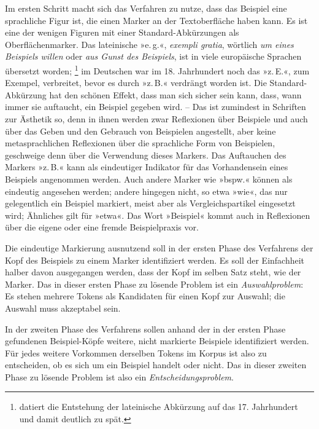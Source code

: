\documentclass{article}
\newcommand*{\latein}{\textit}%
\renewcommand*{\see}{\autocap{v}gl\adddot}%
\begin{document}
Im ersten Schritt macht sich das Verfahren zu nutze, dass das Beispiel
eine sprachliche Figur ist, die einen Marker an der Textoberfläche
haben kann. Es ist eine der wenigen Figuren mit einer
Standard-Abkürzungen als Oberflächenmarker. Das lateinische »e.\,g.«,
\latein{exempli gratia}, wörtlich \emph{um eines Beispiels willen}
oder \emph{aus Gunst des Beispiels}, ist in viele europäische Sprachen
übersetzt worden;%
\footnote{\Textcite[118]{Cappelli1990a} datiert die Entstehung der
  lateinische Abkürzung auf das 17. Jahrhundert und damit deutlich zu
  spät.} %
im Deutschen war im 18. Jahrhundert noch das »z.\,E.«, zum Exempel,
verbreitet, bevor es durch »z.\,B.« verdrängt worden ist. %
Die Standard-Abkürzung hat den schönen Effekt, dass man sich sicher
sein kann, dass, wann immer sie auftaucht, ein Beispiel gegeben
wird. -- Das ist zumindest in Schriften zur Ästhetik so, denn in ihnen
werden zwar Reflexionen über Beispiele und auch über das Geben und den
Gebrauch von Beispielen angestellt, aber keine metasprachlichen
Reflexionen über die sprachliche Form von Beispielen, geschweige denn
über die Verwendung dieses Markers. Das Auftauchen des Markers
»z.\,B.« kann als eindeutiger Indikator für das Vorhandensein eines
Beispiels angenommen werden. Auch andere Marker wie »bspw.« können als
eindeutig angesehen werden; andere hingegen nicht, so etwa »wie«, das
nur gelegentlich ein Beispiel markiert, meist aber als
Vergleichspartikel eingesetzt wird; Ähnliches gilt für »etwa«. Das
Wort »Beispiel« kommt auch in Reflexionen über die eigene oder eine
fremde Beispielpraxis vor.

Die eindeutige Markierung ausnutzend soll in der ersten Phase des
Verfahrens der Kopf des Beispiels zu einem Marker identifiziert
werden. Es soll der Einfachheit halber davon ausgegangen werden, dass
der Kopf im selben Satz steht, wie der Marker. Das in dieser ersten
Phase zu lösende Problem ist ein \emph{Auswahlproblem}: Es stehen
mehrere Tokens als Kandidaten für einen Kopf zur Auswahl; die Auswahl
muss akzeptabel sein.

In der zweiten Phase des Verfahrens sollen anhand der in der ersten
Phase gefundenen Beispiel-Köpfe weitere, nicht markierte Beispiele
identifiziert werden. Für jedes weitere Vorkommen derselben Tokens im
Korpus ist also zu entscheiden, ob es sich um ein Beispiel handelt
oder nicht. Das in dieser zweiten Phase zu lösende Problem ist also
ein \emph{Entscheidungsproblem}.
\end{document}
